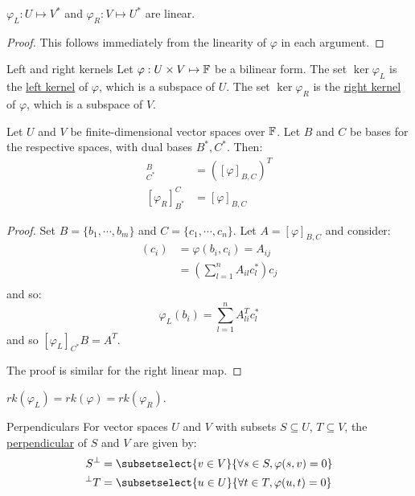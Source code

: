 \documentclass[../Main.tex]{subfiles}
\begin{document}
\begin{lemma}
    $\varphi_L : U \mapsto V^*$ and $\varphi_R : V \mapsto U^*$ are linear.
    \label{lemLRBFLinear}
\end{lemma}
\begin{proof}
    This follows immediately from the linearity of $\varphi$ in each argument.
\end{proof}
\begin{definition}{Left and right kernels}
    Let $\varphi : U \times V \mapsto \mathbb{F}$ be a bilinear form. The set $\ker{\varphi_L}$ is the \underline{left kernel} of $\varphi$, which is a subspace of $U$. 
    The set $\ker{\varphi_R}$ is the \underline{right kernel} of $\varphi$, which is a subspace of $V$.
\end{definition}
\begin{proposition}
    Let $U$ and $V$ be finite-dimensional vector spaces over $\mathbb{F}$. Let $B$ and $C$ be bases for the respective spaces, with dual bases $B^*, C^*$. Then:
    \begin{align*}
        [\varphi_L]_{C^*}^B &= \left([\varphi]_{B, C}\right)^T \\
        [\varphi_R]_{B^*}^C &= [\varphi]_{B, C}
    \end{align*}
    \label{propLRMapsMatrices}
\end{proposition}
\begin{proof}
    Set $B = \{b_1, \cdots, b_m\}$ and $C = \{c_1, \cdots, c_n\}$. Let $A = [\varphi]_{B, C}$ and consider:
    \begin{align*}
        [\varphi(b_i)](c_i)&= \varphi(b_i, c_i) = A_{ij} \\
        &= \left(\sum_{l=1}^{n} A_{il} c_l^*\right) c_j \\
    \end{align*}
    and so:
    \begin{equation*}
        \varphi_L(b_i) = \sum_{l=1}^n A_{li}^T c_l^*
    \end{equation*}
    and so $[\varphi_L]_{C^*}{B} = A^T$.

    The proof is similar for the right linear map.
\end{proof}
\begin{corollary}
    $rk(\varphi_L) = rk(\varphi) = rk(\varphi_R)$.
    \label{corRankLRMap}
\end{corollary}
\begin{definition}{Perpendiculars}
    For vector spaces $U$ and $V$ with subsets $S \subseteq U$, $T \subseteq V$, the \underline{perpendicular} of $S$ and $V$ are given by:
    \begin{align*}
        S^\perp &= \subsetselect{v \in V}{\forall s\in S, \varphi(s, v) = 0} \\
        \lperp{T} &= \subsetselect{u \in U}{\forall t \in T, \varphi(u, t) = 0}
    \end{align*}
\end{definition}
\end{document}
